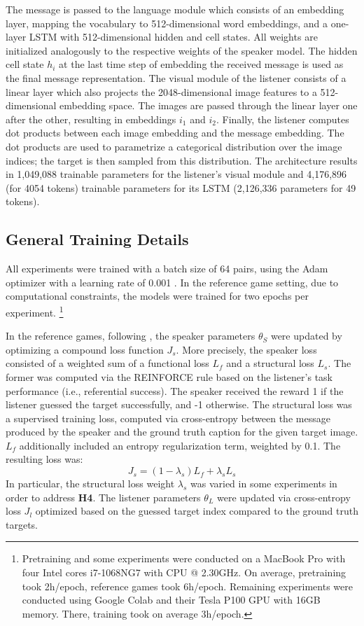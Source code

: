 The message is passed to the language module which consists of an embedding layer, mapping the vocabulary to 512-dimensional word embeddings, and a one-layer LSTM with 512-dimensional hidden and cell states. All weights are initialized analogously to the respective weights of the speaker model. The hidden cell state $h_i$ at the last time step of embedding the received message is used as the final message representation. 
The visual module of the listener consists of a linear layer which also projects the 2048-dimensional image features to a 512-dimensional embedding space. The images are passed through the linear layer one after the other, resulting in embeddings $i_1$ and $i_2$. Finally, the listener computes dot products between each image embedding and the message embedding. The dot products are used to parametrize a categorical distribution over the image indices; the target is then sampled from this distribution.  
The architecture results in 1,049,088 trainable parameters for the listener's visual module and 4,176,896 (for 4054 tokens) trainable parameters for its LSTM (2,126,336 parameters for 49 tokens).


\subsection{General Training Details}

All experiments were trained with a batch size of 64 pairs, using the Adam optimizer with a learning rate  of 0.001 \parencite{kingma2014adam}. In the reference game setting, due to computational constraints, the models were trained for two epochs per experiment. \footnote{Pretraining and some experiments were conducted on a MacBook Pro with four Intel cores i7-1068NG7 with CPU @ 2.30GHz. On average, pretraining took 2h/epoch, reference games took 6h/epoch. Remaining experiments were conducted using Google Colab and their Tesla P100 GPU with 16GB memory. There, training took on average 3h/epoch.} 

In the reference games, following \cite{lazaridou2020multi}, the speaker parameters $\theta_S$ were updated by optimizing a compound loss function $J_s$. More precisely, the speaker loss consisted of a weighted sum of a functional loss $L_f$ and a structural loss $L_s$. The former was computed via the REINFORCE rule based on the listener's task performance (i.e., referential success). The speaker received the reward 1 if the listener guessed the target successfully, and -1 otherwise. The structural loss was a supervised training loss, computed via cross-entropy between the message produced by the speaker and the ground truth caption for the given target image. $L_f$ additionally included an entropy regularization term, weighted by 0.1. The resulting loss was:
\begin{equation}
J_s = (1-\lambda_s)L_f + \lambda_s L_s
\end{equation}
In particular, the structural loss weight $\lambda_s$ was varied in some experiments in order to address \textbf{H4}.
The listener parameters $\theta_L$ were updated via cross-entropy loss $J_l$ optimized based on the guessed target index compared to the ground truth targets. 

